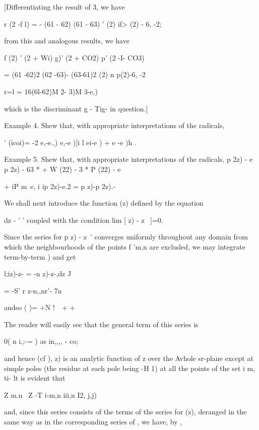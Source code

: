 {[Differentiating the result of 3, we have

r (2 -f l) = - (61 - 62) (61 - 63) ' (2) if> (2) - 6, -2;

from this and analogous results, we have

f (2) ' (2 + Wi) g)' (2 + CO2) p' (2 -I- CO3)

= (61 -62)2 (62 -63)- (63-61)2 (2) n p(2)-6, -2

r=l = 16(6l-62)M 2- 3)M 3-e,)

which is the discriminant g - Tig- in question.]

%
%

Example 4. Shew that, with appropriate interpretations of the
radicals,

 ' (icoi)= -2 e,-e.,) e,-e )]i l ei-e ) + e -e )h .


Example 5. Shew that, with appropriate interpretations of the
radicals, p 2z) - e p 2z) - 63 * + W (22) - 3 * P (22) - e

+ iP m~e, i ip 2z)-e.2 = p z)-p 2z).-


We shall next introduce the function (z) defined by the equation

dz - ' ' coupled with the condition lim [ z) - z~ ]=0.

Since the series for p z) - z~' converges uniformly throughout any
domain from which the neighbourhoods of the points f 'm,n are
excluded, we may integrate term-by-term ) and get

l;iz)-z- = -n z)-z-,dz J

= -S' r z-n,,nr'- 7n%

andso ( )= +N !\ \ + +

The reader will easily see that the general term of this series is

0( n i,;-= ) as in,,,, - co;

and hence (cf ), z) is an analytic function of z over the Avhole
sr-plane except at simple poles (the residue at each pole being -H 1)
at all the points of the set i m, ti- lt is evident that

Z m.n \ Z -T i-m,n iii,n I2, j,j)

and, since this series consists of the terms of the series for (z),
deranged in the same way as in the corresponding series of , we
have, by ,

}
